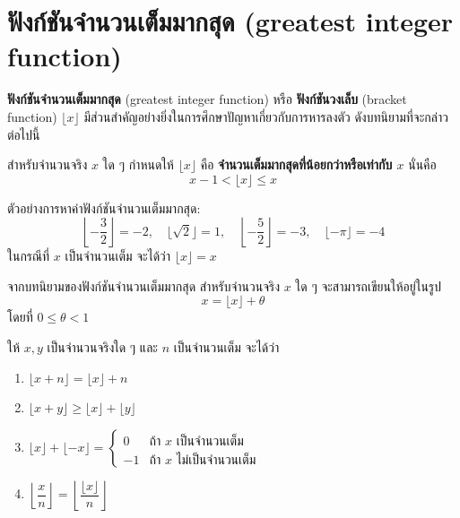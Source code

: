 \newpage
\section{ฟังก์ชันจำนวนเต็มมากสุด (greatest integer function)}
\textbf{ฟังก์ชันจำนวนเต็มมากสุด} (greatest integer function) หรือ \textbf{ฟังก์ชันวงเล็บ} (bracket function) $\lfloor x \rfloor$ มีส่วนสำคัญอย่างยิ่งในการศึกษาปัญหาเกี่ยวกับการหารลงตัว ดังบทนิยามที่จะกล่าวต่อไปนี้ 
\begin{definitionbox}
	สำหรับจำนวนจริง $x$ ใด ๆ กำหนดให้ $\lfloor x \rfloor$ คือ \textbf{จำนวนเต็มมากสุดที่น้อยกว่าหรือเท่ากับ $x$} นั่นคือ 
	\[ x - 1 < \lfloor x \rfloor \leq x \]
\end{definitionbox}

\begin{examplebox}
	ตัวอย่างการหาค่าฟังก์ชันจำนวนเต็มมากสุด:
	\[ \left\lfloor -\dfrac{3}{2} \right\rfloor = -2, \quad \lfloor \sqrt{2} \rfloor = 1, \quad \left\lfloor -\dfrac{5}{2} \right\rfloor = -3, \quad \lfloor -\pi \rfloor = -4 \]
	ในกรณีที่ $x$ เป็นจำนวนเต็ม จะได้ว่า $\lfloor x \rfloor = x$
\end{examplebox}

\remark จากบทนิยามของฟังก์ชันจำนวนเต็มมากสุด สำหรับจำนวนจริง $x$ ใด ๆ จะสามารถเขียนให้อยู่ในรูป
\[ x = \lfloor x \rfloor + \theta \]
โดยที่ $0 \leq \theta < 1$ 

\begin{theorembox}
	ให้ $x, y$ เป็นจำนวนจริงใด ๆ และ $n$ เป็นจำนวนเต็ม จะได้ว่า
	\begin{enumerate}
		\item $\lfloor x + n \rfloor = \lfloor x \rfloor + n$
		\item $\lfloor x + y \rfloor \geq \lfloor x \rfloor + \lfloor y \rfloor$
		\item $\lfloor x \rfloor + \lfloor -x \rfloor = 
		\begin{cases} 
			0 & \text{ถ้า $x$ เป็นจำนวนเต็ม} \\ 
			-1 & \text{ถ้า $x$ ไม่เป็นจำนวนเต็ม} 
		\end{cases}$
		\item $\left\lfloor \dfrac{x}{n} \right\rfloor = \left\lfloor \dfrac{\lfloor x \rfloor}{n} \right\rfloor$
	\end{enumerate}
\end{theorembox}

